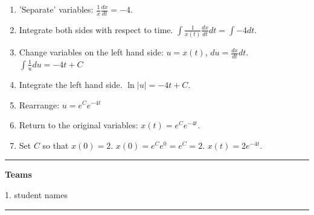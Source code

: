 \documentclass[12pt,letterpaper,noanswers]{exam}
\begin{document}
\begin{enumerate}
    \item 'Separate' variables: $\frac{1}{x}\frac{dx}{dt} = -4$.
    \item Integrate both sides with respect to time.  $\displaystyle\int \frac{1}{x(t)}\frac{dx}{dt}dt = \int -4 dt$.
    \item Change variables on the left hand side: $u = x(t)$, 
    $du = \frac{dx}{dt}dt$.  
    $\int \frac{1}{u}du = -4t + C$
    \item Integrate the left hand side.  $\ln \vert u\vert = -4t + C$.
    \item Rearrange: $u = e^Ce^{-4t}$
    \item Return to the original variables: $x(t) = e^Ce^{-4t}$.
    \item Set $C$ so that $x(0) = 2$.  $x(0) = e^Ce^{0} = e^C = 2$.  $x(t) = 2e^{-4t}$. 
\end{enumerate}

\vspace{0.2cm}
\hrule
\vspace{0.2cm}

\noindent\textbf{Teams}

\begin{multicols}{2}

1.  student names
\end{multicols}


\vspace{0.2cm}
\hrule
\vspace{0.2cm}




\end{document}
